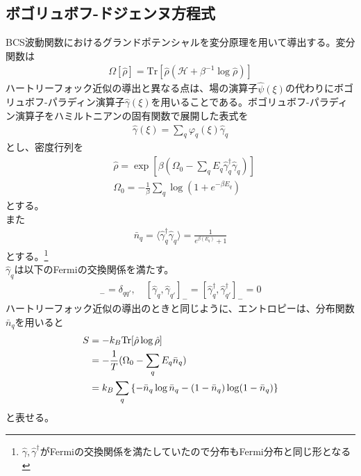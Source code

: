 \documentclass[dvipdfmx, 11pt, a4paper]{jsarticle}
\numberwithin{equation}{section}
\theoremstyle{definition}
\begin{document}
\subsection{ボゴリュボフ-ドジェンヌ方程式}
    BCS波動関数におけるグランドポテンシャルを変分原理を用いて導出する。変分関数は
    \begin{align}
        \Omega[\hat{\rho}] = \mathrm{Tr}[\hat{\rho}(\mathcal{H}+\beta^{-1}\log \hat{\rho})]
    \end{align}
    ハートリーフォック近似の導出と異なる点は、場の演算子$\hat{\psi}(\xi)$の代わりにボゴリュボフ-パラディン演算子$\hat{\gamma}(\xi)$を用いることである。ボゴリュボフ-パラディン演算子をハミルトニアンの固有関数で展開した表式を
    \begin{align}
        \hat{\gamma}(\xi) = \sum_q \varphi_q(\xi) \hat{\gamma}_q
    \end{align}
    とし、密度行列を
    \begin{align}
        &\hat{\rho} = \exp \left[ \beta\left( \Omega_0 - \sum_q E_q \hat{\gamma}^\dagger_q \hat{\gamma}_q \right) \right] \\
        &\Omega_0 = -\frac{1}{\beta}\sum_q\log (1+e^{-\beta E_q})
    \end{align}
    とする。\\
    また
    \begin{align}
        \bar{n}_q = \langle \hat{\gamma}_q^\dagger \hat{\gamma}_q\rangle  = \frac{1}{e^{\beta(E_q)}+1}
    \end{align}
    とする。\footnote{$\hat{\gamma},\hat{\gamma}^\dagger$がFermiの交換関係を満たしていたので分布もFermi分布と同じ形となる}\\
    $\hat{\gamma}_q$は以下のFermiの交換関係を満たす。
    \begin{align}
        [\hat{\gamma}_q,\hat{\gamma}^\dagger_q]_- = \delta_{qq'},\quad [\hat{\gamma}_q,\hat{\gamma}_{q'}]_- = [\hat{\gamma}^\dagger_q,\hat{\gamma}_{q'}^\dagger]_- = 0
    \end{align}
    ハートリーフォック近似の導出のときと同じように、エントロピーは、分布関数$\bar{n}_q$を用いると
    \begin{align}
        S &= -k_B \mathrm{Tr}[\hat{\rho} \log \hat{\rho}] \notag \\
        &= -\frac{1}{T}(\Omega_0 - \sum_q E_q\bar{n}_q) \notag \\
        &= k_B \sum_q\left\{ -\bar{n}_q\log \bar{n}_q - (1-\bar{n}_q)\log(1-\bar{n}_q) \right\}
    \end{align}
    と表せる。\\
\end{document}

